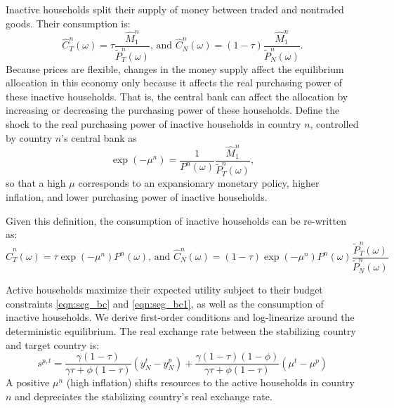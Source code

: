 Inactive households split their supply of money between traded and
nontraded goods. Their consumption is:
\begin{equation*}
  \hat{C}^n_T (\omega) = \tau \frac{\hat{M}^n_1}{\tilde{P}^n_T(\omega)}
  \text{, and }
  \hat{C}^n_N (\omega) = (1 - \tau) \frac{\hat{M}^n_1}{\tilde{P}^n_N(\omega)}.
\end{equation*}
Because prices are flexible, changes in the money supply affect the
equilibrium allocation in this economy only because it affects the
real purchasing power of these inactive households. That is, the
central bank can affect the allocation by increasing or decreasing the
purchasing power of these households. Define the shock to the real
purchasing power of inactive households in country $n$, controlled by
country \(n\)'s central bank as \begin{equation} \exp(-\mu^n) =
  \frac{1}{P^n(\omega)} \frac{\hat{M}^n_1}{\tilde{P}^n_T(\omega)},
  \label{eqn:def_mu}
\end{equation}
so that a high \(\mu\) corresponds to an expansionary monetary policy,
higher inflation, and lower purchasing power of inactive households.


Given this definition, the consumption of inactive households can be
re-written as:
\begin{equation*}
  \hat{C}^n_T (\omega)
  = \tau \exp(-\mu^n) P^n(\omega)
  \text{, and }
  \hat{C}^n_N (\omega)
  = (1 - \tau) \exp(-\mu^n) P^n(\omega)
  \frac{\tilde{P}^n_T(\omega)}{\tilde{P}^n_N(\omega)}
\end{equation*}


\iffalse By combining equation \eqref{eqn:def_mu} with equation
\eqref{eqn:seg_bc1}, we can express the country-level budget
constraint for country $n$ as:
\begin{equation*}
  \int \frac{\Lambda_T(\omega)}{\Lambda_{T, 1}}
  \left( P^n(\omega)C^n(\omega) + \frac{1 - \phi}{\phi} \exp(-\mu) P^n(\omega) \right)
  g(\omega) d\omega 
  = \frac{1}{\phi} \left( Q_N + Q_k + \kappa^n  + \frac{\tilde{M}^n_0}{\tilde{P}^n_{T,1}}\right).
\end{equation*}
\fi

Active households maximize their expected utility subject to their
budget constraints \eqref{eqn:seg_bc} and \eqref{eqn:seg_bc1}, as well
as the consumption of inactive households. We derive first-order
conditions and log-linearize around the deterministic equilibrium. The
real exchange rate between the stabilizing country and target country
is:
\begin{equation*}
  s^{p, t}
  = \frac{\gamma (1 - \tau)}{\gamma \tau + \phi (1 - \tau)}
  \left( y^t_N - y^p_N \right)
  + \frac{\gamma (1 - \tau)(1 - \phi) }{\gamma \tau + \phi (1 - \tau)}
  \left( \mu^t - \mu^p \right)
\end{equation*}
A positive \(\mu^n\) (high inflation) shifts resources to the active
households in country \(n\) and depreciates the stabilizing country's
real exchange rate.

